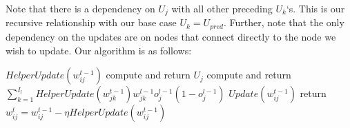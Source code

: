 \documentclass[11pt]{article}
\begin{document}
\vspace{5 mm}
\noindent
Note that there is a dependency on $U_{j}$ with all other preceding $U_{k}$`s. 
This is our recursive relationship with our base case $U_{k} = U_{pred}$. 
Further, note that the only dependency on the updates are on nodes that connect 
directly to the node we wish to update. Our algorithm is as follows:

\vspace{5 mm}
\noindent
\begin{algorithmic}
\STATE $HelperUpdate(w_{i j}^{t - 1})$
    \STATE compute and return $U_{j}$ 
\ELSE
    \STATE compute and return $\sum_{k = 1}^{I_{l}} 
    HelperUpdate(w_{j k}^{t - 1}) 
    w_{j k}^{l - 1} o_{j}^{l - 1} (1 - o_{j}^{l - 1})$
\ENDIF
\STATE $Update(w_{i j}^{t - 1})$
\STATE return $w_{i j}^{t} = w_{i j}^{t - 1} - 
\eta HelperUpdate(w_{i j}^{t - 1})$
\end{algorithmic}
\end{document}
